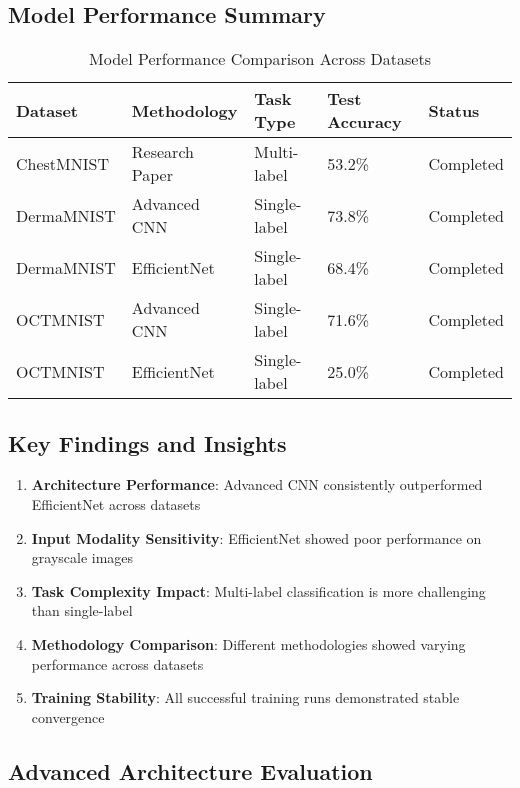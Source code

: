 \documentclass[12pt,a4paper]{article}
\begin{document}
\subsection{Model Performance Summary}

\begin{table}[H]
\centering
\caption{Model Performance Comparison Across Datasets}
\begin{tabular}{@{}lllll@{}}
\toprule
\textbf{Dataset} & \textbf{Methodology} & \textbf{Task Type} & \textbf{Test Accuracy} & \textbf{Status} \\ \midrule
ChestMNIST & Research Paper & Multi-label & 53.2\% & Completed \\
DermaMNIST & Advanced CNN & Single-label & 73.8\% & Completed \\
DermaMNIST & EfficientNet & Single-label & 68.4\% & Completed \\
OCTMNIST & Advanced CNN & Single-label & 71.6\% & Completed \\
OCTMNIST & EfficientNet & Single-label & 25.0\% & Completed \\ \bottomrule
\end{tabular}
\end{table}

\subsection{Key Findings and Insights}

\begin{enumerate}
    \item \textbf{Architecture Performance}: Advanced CNN consistently outperformed EfficientNet across datasets
    \item \textbf{Input Modality Sensitivity}: EfficientNet showed poor performance on grayscale images
    \item \textbf{Task Complexity Impact}: Multi-label classification is more challenging than single-label
    \item \textbf{Methodology Comparison}: Different methodologies showed varying performance across datasets
    \item \textbf{Training Stability}: All successful training runs demonstrated stable convergence
\end{enumerate}

\subsection{Advanced Architecture Evaluation}
\end{document}

